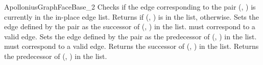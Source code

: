 \begin{ccRefConcept}{ApolloniusGraphFaceBase_2}
%
%
{Checks if the edge corresponding to the pair (, )
is currently in the in-place edge list. Returns  if
(, ) is in the list,  otherwise.}
\ccGlue
{}
{Sets the edge defined by the pair  as the successor of
(, ) in the list.
\ccPrecond {} must correspond to a valid edge.}
\ccGlue
{}
{Sets the edge defined by the pair  as the predecessor of
(, ) in the list.
\ccPrecond {} must correspond to a valid edge.}
\ccGlue
{}
{Returns the successor of (, ) in the list.}
\ccGlue
{}
{Returns the predecessor of (, ) in the list.}


\ccHasModels
{}


\ccSeeAlso
{}\\

\end{ccRefConcept}

